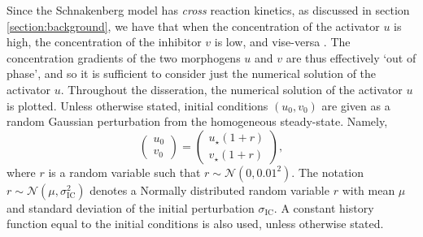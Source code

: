 Since the Schnakenberg model has \textit{cross} reaction kinetics, as discussed in section \ref{section:background}, we have that when the concentration of the activator $u$ is high, the concentration of the inhibitor $v$ is low, and vise-versa \cite{murray}. The concentration gradients of the two morphogens $u$ and $v$ are thus effectively `out of phase', and so it is sufficient to consider just the numerical solution of the activator $u$. Throughout the disseration, the numerical solution of the activator $u$ is plotted. Unless otherwise stated, initial conditions $(u_0,v_0)$ are given as a random Gaussian perturbation from the homogeneous steady-state. Namely,
\begin{equation}\label{firstic}
\begin{pmatrix}u_0\\v_0\end{pmatrix}=\begin{pmatrix}u_\star(1+r)\\v_\star(1+r)\end{pmatrix},
\end{equation}
where $r$ is a random variable such that $r\sim\mathcal{N}\left(0,0.01^2\right)$. The notation $r\sim\mathcal{N}\left(\mu,\sigma_{\text{IC}}^2\right)$ denotes a Normally distributed random variable $r$ with mean $\mu$ and standard deviation of the initial perturbation $\sigma_{\text{IC}}$. A constant history function equal to the initial conditions is also used, unless otherwise stated.

